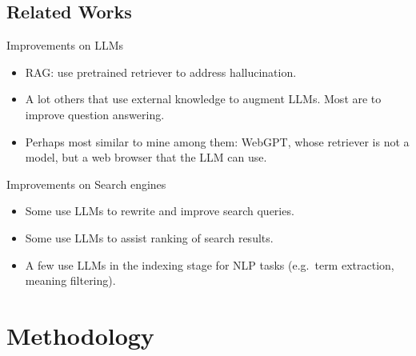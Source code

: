 \documentclass{beamer}
\begin{document}
\subsection{Related Works}

\begin{frame}{Improvements on LLMs}
	\begin{itemize}
		\item RAG: use pretrained retriever to address hallucination.
		\item A lot others that use external knowledge to augment LLMs. Most
			are to improve question answering.
		\item Perhaps most similar to mine among them: WebGPT, whose retriever
			is not a model, but a web browser that the LLM can use.
	\end{itemize}
\end{frame}

\begin{frame}{Improvements on Search engines}
	\begin{itemize}
		\item Some use LLMs to rewrite and improve search queries.
		\item Some use LLMs to assist ranking of search results.
		\item A few use LLMs in the indexing stage for NLP tasks (e.g.\ term
			extraction, meaning filtering).
	\end{itemize}
\end{frame}

\section{Methodology}
\end{document}
